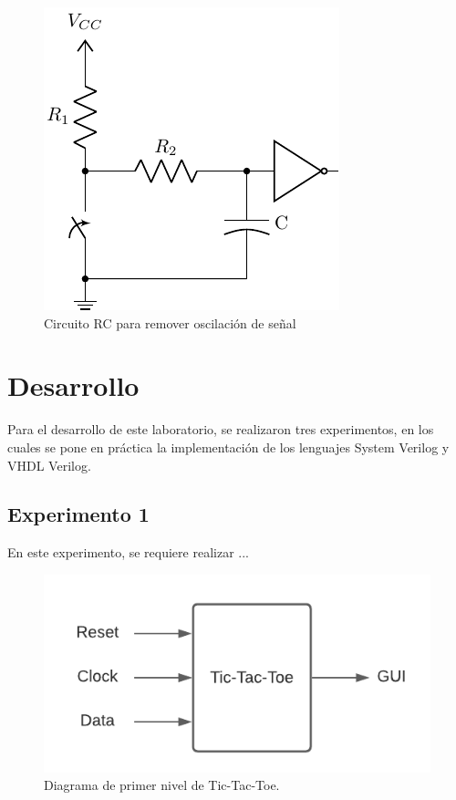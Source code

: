\documentclass[journal,trans]{IEEEtran}
\begin{document}
	\begin{figure}[h]
		\centering
		\includegraphics[scale=0.8]{imagenes/rc_debouncer.pdf}
		\caption{Circuito RC para remover oscilación de señal}
		\label{fig:tikz-debouncer}
	\end{figure}
		
	\section{Desarrollo}
	Para el desarrollo de este laboratorio, se realizaron tres experimentos, en los cuales se pone en práctica la implementación de los lenguajes System Verilog y VHDL Verilog.
	
	\subsection{Experimento 1}
	En este experimento, se requiere realizar ...
	
	\begin{figure}[hbtp]
		\centering
		\includegraphics[width = \columnwidth]{imagenes/PrimerN.png}
		\caption[Figura1]{Diagrama de primer nivel de Tic-Tac-Toe.}
		\label{fig:PrimerN}
	\end{figure}
	
\end{document}
